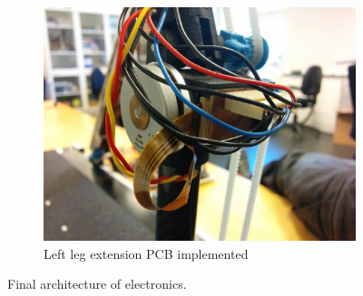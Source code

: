 \begin{figure}[ht]
\begin{subfigure}[b]{0.4\textwidth}
    \includegraphics[width=\textwidth]{figures/photo_electronics_detail.jpg}
    \caption{Left leg extension PCB implemented}
    \label{fig:pcb2}
  \end{subfigure}
  \caption{Final architecture of electronics.}
\end{figure}

